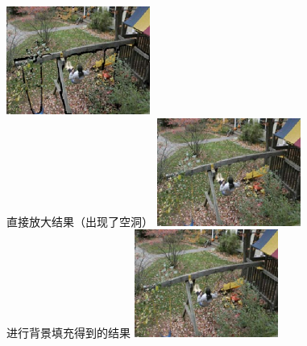 \documentclass[xcolor=svgnames,serif,table,10pt]{beamer}
\begin{document}
\begin{frame}
  \medskip
  \begin{columns}
    \tiny
    \centering
    \includegraphics[width=\textwidth]{lag4.png}\\
    直接放大结果（出现了空洞）
    \centering
    \includegraphics[width=\textwidth]{lag5.png}\\
    进行背景填充得到的结果
    \centering
    \includegraphics[width=\textwidth]{lag6.png}\\

\end{columns}
\end{frame}
\end{document}

